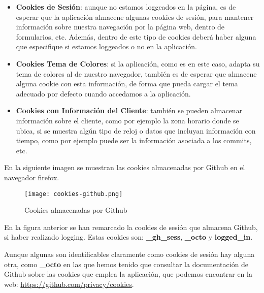\begin{itemize}
    \item \textbf{Cookies de Sesión}: aunque no estamos loggeados en la página, es de esperar que la aplicación almacene algunas cookies de sesión, para mantener información sobre nuestra navegación por la página web, dentro de formularios, etc. Además, dentro de este tipo de cookies deberá haber alguna que especifique si estamos loggeados o no en la aplicación.

    \item \textbf{Cookies Tema de Colores}: si la aplicación, como es en este caso, adapta su tema de colores al de nuestro navegador, también es de esperar que almacene alguna cookie con esta información, de forma que pueda cargar el tema adecuado por defecto cuando accedamos a la aplicación.

    \item \textbf{Cookies con Información del Cliente}: también se pueden almacenar información sobre el cliente, como por ejemplo la zona horario donde se ubica, si se muestra algún tipo de reloj o datos que incluyan información con tiempo, como por ejemplo puede ser la información asociada a los commits, etc.
\end{itemize}

En la siguiente imagen se muestran las cookies almacenadas por Github en el navegador firefox.

    \begin{figure}[H]
    \centering
    \texttt{[image: cookies-github.png]}
    \caption{Cookies almacenadas por Github}
\end{figure}

En la figura anterior se han remarcado la cookies de sesión que almacena Github, si haber realizado logging. Estas cookies son: \textbf{\_gh\_sess}, \textbf{\_octo} y \textbf{logged\_in}.

Aunque algunas son identificables claramente como cookies de sesión hay alguna otra, como \textbf{\_octo} en las que hemos tenido que consultar la documentación de Github sobre las cookies que emplea la aplicación, que podemos encontrar en la web: \url{https://github.com/privacy/cookies}.

%
%

